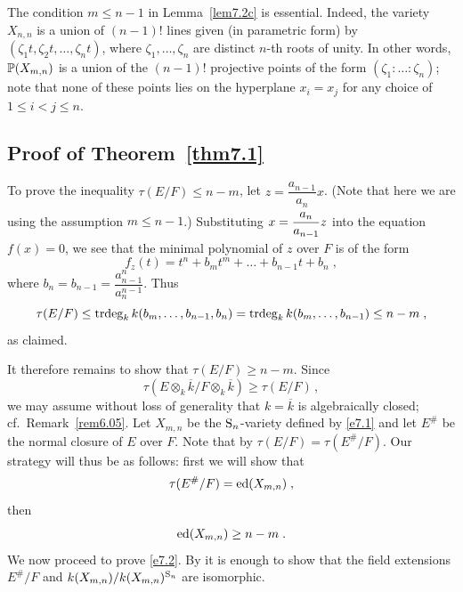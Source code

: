 \begin{remark} \label{rem.x_n,n} 
The condition $m \leq n-1$ in Lemma~\ref{lem7.2c} is essential. Indeed, 
the variety $X_{n,n}$ is a union of $(n-1)!$ lines
given (in parametric form) by $(\zeta_1t, \zeta_2t, \dots, \zeta_nt)$, where
$\zeta_1, \dots, \zeta_n$ are distinct $n$-th roots of unity. In other words,
${\Bbb P}(X_{m,n})$ is a union of the $(n-1)!$ projective points of the form
$(\zeta_1: \dots :\zeta_n)$; note that none of these
points lies on the hyperplane $x_i = x_j$ for any choice of 
$1 \leq i < j \leq n$.
\end{remark}

\subsection*{Proof of Theorem~\ref{thm7.1}}

To prove the inequality $\tau(E/F) \leq n-m$, let 
$z = \dfrac{a_{n-1}}{a_n} x$.
(Note that here we are using the assumption
$m \leq n-1$.) Substituting 
$x = \dfrac{a_n\mathstrut}{a_{n-1\mathstrut}} z$ into the equation
$f(x) = 0$, we see that
the minimal polynomial of $z$ over $F$ is of the form
$$f_z(t) = t^n + b_m t^m + \dots + b_{n-1} t + b_n \; , $$
where $b_n = b_{n-1} = \dfrac{a_{n-1}^n}{a_n^{n-1}}$. Thus
$$ \tau(E/F) \leq \operatorname{trdeg}_k k(b_m, \dots, b_{n-1}, b_n) =
\operatorname{trdeg}_k k(b_m, \dots, b_{n-1}) \leq n-m \; ,$$
as claimed.

It therefore remains to show that $\tau(E/F) \geq n-m$.
Since \[ \tau(E \otimes_k \overline{k}/F \otimes_k \overline{k}) 
\geq \tau(E/F)\, , \] we may assume 
without loss of generality that $k = \overline{k}$ is algebraically 
closed; cf.\ Remark~\ref{rem6.05}.
Let  $ X_{m, n}$ be the ${\operatorname{S}}_n$-variety defined by \eqref{e7.1} and
let $E^{\#}$ be the normal closure of $E$ over $F$. Note that by 
\cite[Lemma 2.3]{br1} $\tau(E/F) = \tau(E^{\#}/F)$. Our strategy will
thus be as follows: first we will show that 
\begin{equation} \label{e7.2}
\tau(E^{\#}/F) = \operatorname{ed}(X_{m, n}) \; , 
\end{equation}
then
\begin{equation} \label{e7.3}
\operatorname{ed}(X_{m, n}) \geq n-m \; .
\end{equation}
We now proceed to prove \eqref{e7.2}. By \cite[Lemma 2.7]{br1} it is 
enough to show that the field extensions 
$E^{\#}/F$ and $k(X_{m, n})/k(X_{m, n})^{{\operatorname{S}}_n}$ are isomorphic. 

